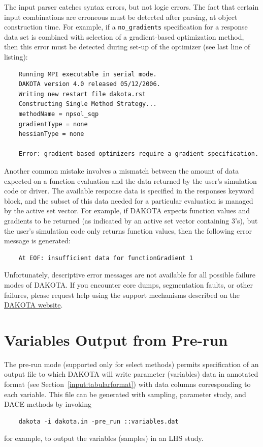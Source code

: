 The input parser catches syntax errors, but not logic errors. The fact
that certain input combinations are erroneous must be detected after
parsing, at object construction time. For example, if a
\texttt{no\_gradients} specification for a response data set is
combined with selection of a gradient-based optimization method, then
this error must be detected during set-up of the optimizer (see last
line of listing):
\begin{small}
\begin{verbatim}
    Running MPI executable in serial mode.
    DAKOTA version 4.0 released 05/12/2006.
    Writing new restart file dakota.rst
    Constructing Single Method Strategy...
    methodName = npsol_sqp
    gradientType = none
    hessianType = none

    Error: gradient-based optimizers require a gradient specification.
\end{verbatim}
\end{small}

Another common mistake involves a mismatch between the amount of data
expected on a function evaluation and the data returned by the user's
simulation code or driver. The available response data is specified in
the responses keyword block, and the subset of this data needed for a
particular evaluation is managed by the active set vector. For
example, if DAKOTA expects function values and gradients to be
returned (as indicated by an active set vector containing 3's), but
the user's simulation code only returns function values, then the
following error message is generated:
\begin{small}
\begin{verbatim}
    At EOF: insufficient data for functionGradient 1
\end{verbatim}
\end{small}

Unfortunately, descriptive error messages are not available for all
possible failure modes of DAKOTA. If you encounter core dumps,
segmentation faults, or other failures, please request help using the
support mechanisms described on the
\href{http://dakota.sandia.gov/}{DAKOTA website}.

\section{Variables Output from Pre-run}

The pre-run mode (supported only for select methods) permits
specification of an output file to which DAKOTA will write parameter
(variables) data in annotated format (see
Section~\ref{input:tabularformat}) with data columns corresponding to
each variable.  This file can be generated with sampling, parameter
study, and DACE methods by invoking
\begin{small}
\begin{verbatim}
    dakota -i dakota.in -pre_run ::variables.dat
\end{verbatim}
\end{small}
for example, to output the variables (samples) in an LHS study.
